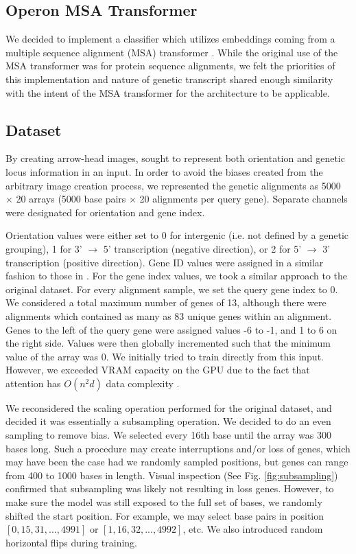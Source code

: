 \documentclass{article}
\begin{document}
\subsection{Operon MSA Transformer}

We decided to implement a classifier which utilizes embeddings coming from a multiple sequence alignment (MSA) transformer \cite{rao_msa_2021}. While the original use of the MSA transformer was for protein sequence alignments, we felt the priorities of this implementation and nature of genetic transcript shared enough similarity with the intent of the MSA transformer for the architecture to be applicable. 

\subsection{Dataset}

By creating arrow-head images, \citet{assaf_detecting_2021} sought to represent both orientation and genetic locus information in an input. In order to avoid the biases created from the arbitrary image creation process, we represented the genetic alignments as 5000 \(\times\) 20 arrays (5000 base pairs \(\times\) 20 alignments per query gene). Separate channels were designated for orientation and gene index. 

Orientation values were either set to 0 for intergenic (i.e. not defined by a genetic grouping), 1 for 3' \( \rightarrow \) 5' transcription (negative direction), or 2 for 5' \( \rightarrow \) 3' transcription (positive direction). Gene ID values were assigned in a similar fashion to those in \citet{assaf_detecting_2021}. For the gene index values, we took a similar approach to the original dataset. For every alignment sample, we set the query gene index to 0. We considered a total maximum number of genes of 13, although there were alignments which contained as many as 83 unique genes within an alignment. Genes to the left of the query gene were assigned values -6 to -1, and 1 to 6 on the right side. Values were then globally incremented such that the minimum value of the array was 0. We initially tried to train directly from this input. However, we exceeded VRAM capacity on the GPU due to the fact that attention has \(O(n^{2} d)\) data complexity \cite{vaswani_attention_2017, igrinis_answer_2021}. 

We reconsidered the scaling operation performed for the original dataset, and decided it was essentially a subsampling operation. We decided to do an even sampling to remove bias. We selected every 16th base until the array was 300 bases long. Such a procedure may create interruptions and/or loss of genes, which may have been the case had we randomly sampled positions, but genes can range from 400 to 1000 bases in length. Visual inspection (See Fig. \ref{fig:subsampling}) confirmed that subsampling was likely not resulting in loss genes. However, to make sure the model was still exposed to the full set of bases, we randomly shifted the start position. For example, we may select base pairs in position \([0, 15, 31, ..., 4991]\) or \([1, 16, 32, ..., 4992]\), etc. We also introduced random horizontal flips during training.  
\end{document}
